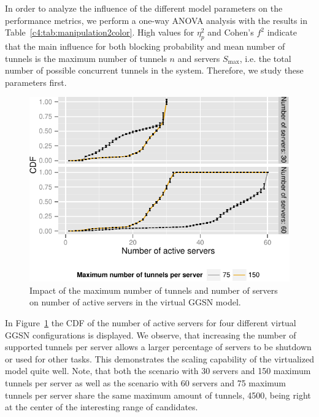In order to analyze the influence of the different model parameters on the performance metrics, we perform a one-way ANOVA analysis with the results in Table~\ref{c4:tab:manipulation2color}. High values for $\eta_p^2$ and Cohen's $f^2$ \cite{stats} indicate that the main influence for both blocking probability and mean number of tunnels is the maximum number of tunnels $n$ and servers $S_{\max}$, i.e. the total number of possible concurrent tunnels in the system.
Therefore, we study these parameters first.

\begin{figure}[htbp]
  \centering
  \includegraphics{images/instanceuse-multiserver-real.pdf}
  \caption{Impact of the maximum number of tunnels and number of servers on number of active servers in the virtual \gls{GGSN} model.}
 \label{c4:fig:instance_use_virtual}
\end{figure}

In Figure~\ref{c4:fig:instance_use_virtual} the \gls{CDF} of the number of active servers for four different virtual \gls{GGSN} configurations is displayed. We observe, that increasing the number of supported tunnels per server allows a larger percentage of servers to be shutdown or used for other tasks. This demonstrates the scaling capability of the virtualized model quite well. Note, that both the scenario with 30 servers and 150 maximum tunnels per server as well as the scenario with 60 servers and 75 maximum tunnels per server share the same maximum amount of tunnels, 4500, being right at the center of the interesting range of candidates.


